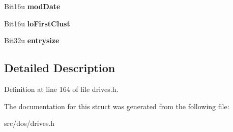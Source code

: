\begin{DoxyCompactItemize}
\item 
\hypertarget{structdirentry_af01ffd8f98a8a32a2c261715e210d17e}{Bit16u {\bfseries mod\-Date}}\label{structdirentry_af01ffd8f98a8a32a2c261715e210d17e}

\item 
\hypertarget{structdirentry_a944ec49c9135d06dea4f8cb2b1c04875}{Bit16u {\bfseries lo\-First\-Clust}}\label{structdirentry_a944ec49c9135d06dea4f8cb2b1c04875}

\item 
\hypertarget{structdirentry_ab5b8d6dd3afa5f72dbd04eeee2f2973b}{Bit32u {\bfseries entrysize}}\label{structdirentry_ab5b8d6dd3afa5f72dbd04eeee2f2973b}

\end{DoxyCompactItemize}


\subsection{Detailed Description}


Definition at line 164 of file drives.\-h.



The documentation for this struct was generated from the following file\-:\begin{DoxyCompactItemize}
\item 
src/dos/drives.\-h\end{DoxyCompactItemize}
